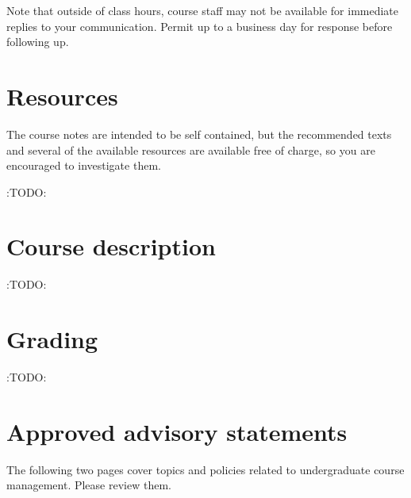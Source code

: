 \documentclass[11pt]{article}
\begin{document}
Note that outside of class hours, course staff may not be available
for immediate replies to your communication.
Permit up to a business day for response before following up.

\section{Resources}
\label{sec:orgdf37760}
The course notes are intended to be self contained,
but the recommended texts and several of the available resources
are available free of charge,
so you are encouraged to investigate them.

:TODO:

\section{Course description}
\label{sec:orgda88f8b}
:TODO:

\section{Grading}
\label{sec:org3d91656}
:TODO:

\section{Approved advisory statements}
\label{sec:org2a91490}
The following two pages cover topics and policies
related to undergraduate course management.
Please review them.


\end{document}
